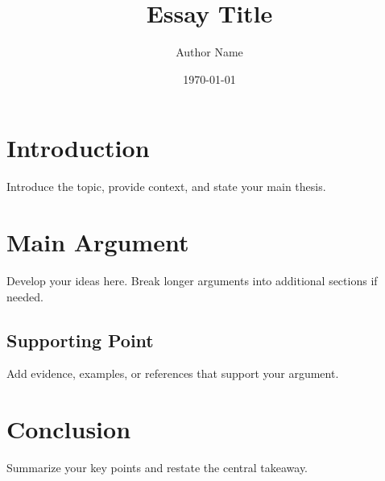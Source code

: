\documentclass[11pt,a4paper]{article}
\title{Essay Title}
\author{Author Name}
\date{\today}
\begin{document}
\maketitle

\section{Introduction}

Introduce the topic, provide context, and state your main thesis.

\section{Main Argument}

Develop your ideas here. Break longer arguments into additional sections if needed.

\subsection{Supporting Point}

Add evidence, examples, or references that support your argument.

\section{Conclusion}

Summarize your key points and restate the central takeaway.
\end{document}
